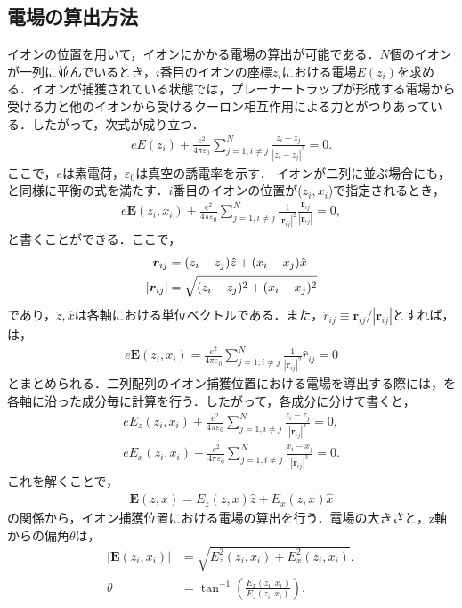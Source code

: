 \subsection{電場の算出方法}
イオンの位置を用いて，イオンにかかる電場の算出が可能である．$N$個のイオンが一列に並んでいるとき，$i$番目のイオンの座標$z_{i}$における電場$E(z_{i})$を求める．イオンが捕獲されている状態では，プレーナートラップが形成する電場から受ける力と他のイオンから受けるクーロン相互作用による力とがつりあっている．したがって，次式が成り立つ\cite{Brownnutt_2012}．
\large
\begin{align}\label{eq:equi_string}
eE(z_i) + \frac{e^2}{4\pi \varepsilon_0} \sum^N_{j=1,i\neq j} \frac{z_i - z_j}{|z_i - z_j|^3} = 0.
\end{align}
\normalsize
ここで，$e$は素電荷，$\varepsilon_0$は真空の誘電率を示す．
イオンが二列に並ぶ場合にも，と同様に平衡の式を満たす．$i$番目のイオンの位置が($z_i,x_i$)で指定されるとき，
\large
\begin{align}\label{eq:equi_array}
e\bm{E}(z_i,x_i) + \frac{e^2}{4\pi \varepsilon_0}\sum^N_{j=1,i\neq j}\frac{1}{|\bm{r}_{ij}|^2}\frac{\bm{r}_{ij}}{|\bm{r}_{ij}|} = 0,
\end{align}
\normalsize
と書くことができる．ここで，
\large
\begin{align}
\bm{r}_{ij} &= (z_i - z_j)\hat{z} + (x_i - x_j)\hat{x} \notag \\
|\bm{r}_{ij}| &= \sqrt{(z_i - z_j)^2 + (x_i - x_j)^2} \notag 
\end{align}
\normalsize
であり，$\hat{z},\hat{x}$は各軸における単位ベクトルである．また，$\hat{r}_{ij} \equiv \bm{r}_{ij}/|\bm{r}_{ij}|$とすれば，は，
\large
\begin{align}\label{eq:equi_array_2}
e\bm{E}(z_i,x_i) = \frac{e^2}{4\pi \varepsilon_0}\sum^N_{j=1,i\neq j} \frac{1}{|\bm{r}_{ij}|^2}\hat{r}_{ij} = 0
\end{align}
\normalsize
とまとめられる．二列配列のイオン捕獲位置における電場を導出する際には，を各軸に沿った成分毎に計算を行う．したがって，各成分に分けて書くと，
\large
\begin{align}
eE_z(z_i,x_i) + \frac{e^2}{4\pi \varepsilon_0} \sum^N_{j=1,i \neq j}\frac{z_i - z_j}{|\bm{r}_{ij}|^3} = 0 , \\
eE_x(z_i,x_i) + \frac{e^2}{4\pi \varepsilon_0} \sum^N_{j=1,i \neq j}\frac{x_i - x_j}{|\bm{r}_{ij}|^3} = 0 .
\end{align}
\normalsize
これを解くことで，
\large
\begin{align}
\bm{E}(z,x) = E_z(z,x)\hat{z} + E_x(z,x)\hat{x}
\end{align}
\normalsize
の関係から，イオン捕獲位置における電場の算出を行う．電場の大きさと，z軸からの偏角$\theta$は，
\large
\begin{align}
|\bm{E}(z_i,x_i)| &= \sqrt{E_z^2(z_i,x_i) + E_x^2(z_i,x_i)}, \\
\theta &= \tan^{-1} \left(\frac{E_x(z_i,x_i)}{E_z(z_i,x_i)} \right) .
\end{align}
\normalsize